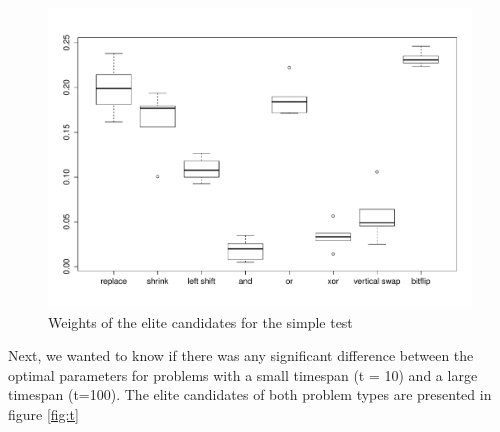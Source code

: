\documentclass[]{article}
\begin{document}

\begin{figure}
	\includegraphics[width=\textwidth]{boxplot_general.pdf}
	\caption{Weights of the elite candidates for the simple test}
	\label{fig:general}
\end{figure}

Next, we wanted to know if there was any significant difference between the optimal parameters for problems with a small timespan (t = 10) and a large timespan (t=100). The elite candidates of both problem types are presented in figure \ref{fig:t}
\end{document}
